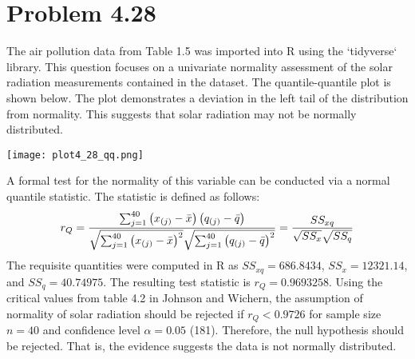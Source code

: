


\maketitle

\section*{Problem 4.28}
The air pollution data from Table 1.5 was imported into R using the `tidyverse` library. This question focuses on a univariate normality assessment of the solar radiation measurements contained in the dataset. The quantile-quantile plot is shown below. The plot demonstrates a deviation in the left tail of the distribution from normality. This suggests that solar radiation may not be normally distributed.
\begin{center}
	\texttt{[image: plot4\_28\_qq.png]}
\end{center}
A formal test for the normality of this variable can be conducted via a normal quantile statistic. The statistic is defined as follows: $$r_Q = \frac{\sum_{j = 1}^{40} \begin{pmatrix}x_{(j)} - \bar{x}\end{pmatrix} \begin{pmatrix}q_{(j)} - \bar{q}\end{pmatrix}}{\sqrt{\sum_{j = 1}^{40} \begin{pmatrix}x_{(j)} - \bar{x}\end{pmatrix}^2} \sqrt{\sum_{j = 1}^{40} \begin{pmatrix}q_{(j)} - \bar{q}\end{pmatrix}^2}} = \frac{SS_{xq}}{\sqrt{SS_x} \sqrt{SS_q}}$$ The requisite quantities were computed in R as $SS_{xq} = 686.8434$, $SS_x = 12321.14$, and $SS_q = 40.74975$. The resulting test statistic is $r_Q = 0.9693258$. Using the critical values from table 4.2 in Johnson and Wichern, the assumption of normality of solar radiation should be rejected if $r_Q < 0.9726$ for sample size $n = 40$ and confidence level $\alpha = 0.05$ (181). Therefore, the null hypothesis should be rejected. That is, the evidence suggests the data is not normally distributed.

\newpage
